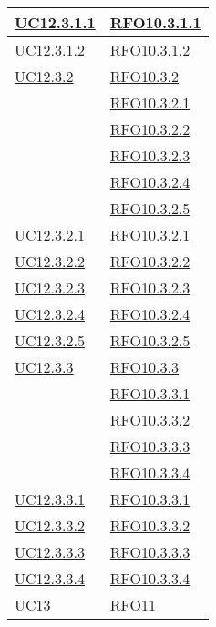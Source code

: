\begin{longtable}{|>{\centering}m{5cm}|m{5cm}<{\centering}|}
\hyperlink{UC12.3.1.1}{UC12.3.1.1} & \hyperlink{RFO10.3.1.1}{RFO10.3.1.1}\\\hline
\hyperlink{UC12.3.1.2}{UC12.3.1.2} & \hyperlink{RFO10.3.1.2}{RFO10.3.1.2}\\\hline

\hyperlink{UC12.3.2}{UC12.3.2}
& \hyperlink{RFO10.3.2}{RFO10.3.2}\\
& \hyperlink{RFO10.3.2.1}{RFO10.3.2.1}\\
& \hyperlink{RFO10.3.2.2}{RFO10.3.2.2}\\
& \hyperlink{RFO10.3.2.3}{RFO10.3.2.3}\\
& \hyperlink{RFO10.3.2.4}{RFO10.3.2.4}\\
& \hyperlink{RFO10.3.2.5}{RFO10.3.2.5}\\\hline

\hyperlink{UC12.3.2.1}{UC12.3.2.1} & \hyperlink{RFO10.3.2.1}{RFO10.3.2.1}\\\hline
\hyperlink{UC12.3.2.2}{UC12.3.2.2} & \hyperlink{RFO10.3.2.2}{RFO10.3.2.2}\\\hline
\hyperlink{UC12.3.2.3}{UC12.3.2.3} & \hyperlink{RFO10.3.2.3}{RFO10.3.2.3}\\\hline
\hyperlink{UC12.3.2.4}{UC12.3.2.4} & \hyperlink{RFO10.3.2.4}{RFO10.3.2.4}\\\hline
\hyperlink{UC12.3.2.5}{UC12.3.2.5} & \hyperlink{RFO10.3.2.5}{RFO10.3.2.5}\\\hline

\hyperlink{UC12.3.3}{UC12.3.3}
& \hyperlink{RFO10.3.3}{RFO10.3.3}\\
& \hyperlink{RFO10.3.3.1}{RFO10.3.3.1}\\
& \hyperlink{RFO10.3.3.2}{RFO10.3.3.2}\\
& \hyperlink{RFO10.3.3.3}{RFO10.3.3.3}\\
& \hyperlink{RFO10.3.3.4}{RFO10.3.3.4}\\\hline

\hyperlink{UC12.3.3.1}{UC12.3.3.1} & \hyperlink{RFO10.3.3.1}{RFO10.3.3.1}\\\hline
\hyperlink{UC12.3.3.2}{UC12.3.3.2} & \hyperlink{RFO10.3.3.2}{RFO10.3.3.2}\\\hline
\hyperlink{UC12.3.3.3}{UC12.3.3.3} & \hyperlink{RFO10.3.3.3}{RFO10.3.3.3}\\\hline
\hyperlink{UC12.3.3.4}{UC12.3.3.4} & \hyperlink{RFO10.3.3.4}{RFO10.3.3.4}\\\hline

\hyperlink{UC13}{UC13} & \hyperlink{RFO11}{RFO11}\\\hline


\end{longtable}
